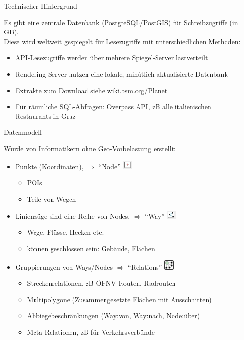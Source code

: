 \documentclass{beamer}
\begin{document}
\begin{frame}{Technischer Hintergrund}

Es gibt eine zentrale Datenbank (PostgreSQL/PostGIS) für Schreibzugriffe (in GB).\\
\pause
Diese wird weltweit gespiegelt für Lesezugriffe mit unterschiedlichen Methoden:

\begin{itemize}
  \item API-Lesezugriffe werden über mehrere Spiegel-Server lastverteilt
  \item Rendering-Server nutzen eine lokale, minütlich aktualisierte Datenbank
  \item Extrakte zum Download siehe \href{http://wiki.osm.org/Planet}{wiki.osm.org/Planet}
  \item Für räumliche SQL-Abfragen: Overpass API, zB alle italienischen Restaurants in Graz
\end{itemize}

\end{frame}


\begin{frame}{Datenmodell}

Wurde von Informatikern ohne Geo-Vorbelastung erstellt:
\begin{itemize}
  \item Punkte (Koordinaten), $\Rightarrow$ ``Node'' \includegraphics[width=0.5cm]{node.png}
	\begin{itemize}
          \item POIs
\pause
\item Teile von Wegen
\end{itemize}
  \item Linienzüge sind eine Reihe von Nodes, $\Rightarrow$ ``Way'' \includegraphics[width=0.5cm]{way.png}
	\begin{itemize}
	  \item Wege, Flüsse, Hecken etc.
	\item können geschlossen sein: Gebäude, Flächen
\end{itemize}
\pause
  \item Gruppierungen von Ways/Nodes $\Rightarrow$ ``Relations'' \includegraphics[width=0.5cm]{relation.png}
	\begin{itemize}
          \item Streckenrelationen, zB ÖPNV-Routen, Radrouten
	\item Multipolygone (Zusammengesetzte Flächen mit Ausschnitten)
	\item Abbiegebeschränkungen (Way:von, Way:nach, Node:über)
	\item Meta-Relationen, zB für Verkehrsverbünde
	\end{itemize}
\end{itemize}

\end{frame}
\end{document}
